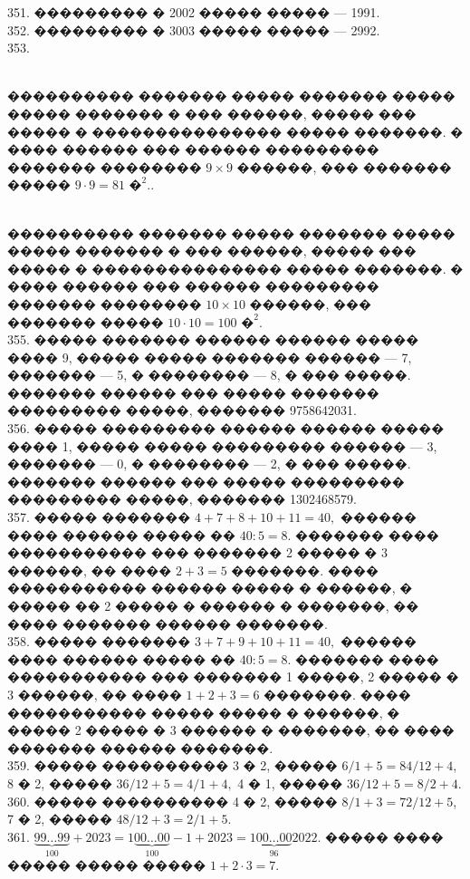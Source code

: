 \documentclass[12pt]{article}
\begin{document}
351. ��������� � 2002 ����� ����� --- 1991.\\
352. ��������� � 3003 ����� ����� --- 2992.\\
353. \begin{figure}[ht!]
\end{figure}\\
���������� ������� ����� ������� ����� ����� ������� � ��� ������, ����� ��� ����� � ��������������� ����� �������. � ���� ������ ��� ������ ��������� ������� �������� $9\times9$ ������, ��� ������� ����� $9\cdot9=81\text{ �}^2.$\newpage{}. \begin{figure}[ht!]
\end{figure}\\
���������� ������� ����� ������� ����� ����� ������� � ��� ������, ����� ��� ����� � ��������������� ����� �������. � ���� ������ ��� ������ ��������� ������� �������� $10\times10$ ������, ��� ������� ����� $10\cdot10=100\text{ �}^2.$\\
355. ����� ������� ������ ������ ����� ���� 9, ����� ����� ������� ������ --- 7, ������� --- 5, � �������� --- 8, � ��� �����. ������� ������ ��� ����� ������� ��������� �����, ������� 9758642031.\\
356. ����� ��������� ������ ������ ����� ���� 1, ����� ����� ��������� ������ --- 3, ������� --- 0, � �������� --- 2, � ��� �����. ������� ������ ��� ����� ��������� ��������� �����, ������� 1302468579.\\
357. ����� ������� $4+7+8+10+11=40,$ ������ ���� ������ ����� �� $40:5=8.$ ������� ���� ����������� ��� ������� 2 ����� � 3 ������, �� ���� $2+3=5$ �������. ���� ����������� ������ ����� � ������, � ����� �� 2 ����� � ������ � �������, �� ���� ������� ������ �������.\\
358. ����� ������� $3+7+9+10+11=40,$ ������ ���� ������ ����� �� $40:5=8.$ ������� ���� ����������� ��� ������� 1 �����, 2 ����� � 3 ������, �� ���� $1+2+3=6$ �������. ���� ����������� ����� ����� � ������, � ����� 2 ����� � 3 ������ � �������, �� ���� ������� ������ �������.\\
359. ����� ���������� 3 � 2, ����� $6/1+5=84/12+4$, 8 � 2, ����� $36/12+5=4/1+4,$ 4 � 1, ����� $36/12+5=8/2+4.$\\
360. ����� ���������� 4 � 2, ����� $8/1+3=72/12+5$, 7 � 2, ����� $48/12+3=2/1+5.$\\
361. $\underbrace{99\ldots99}_{100}+2023=1\underbrace{00\ldots00}_{100}-1+2023=1\underbrace{00\ldots00}_{96}2022.$ ����� ���� ����� ����� ����� $1+2\cdot3=7.$\\
\end{document}
